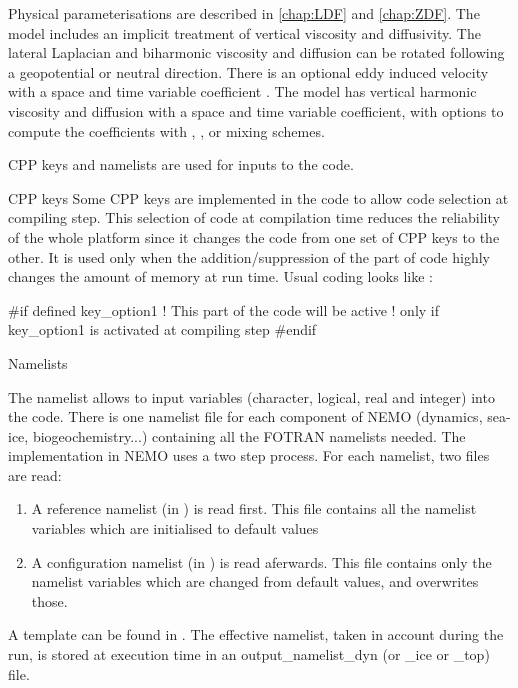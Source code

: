 \documentclass[../main/NEMO_manual]{subfiles}
\begin{document}
Physical parameterisations are described in \autoref{chap:LDF} and \autoref{chap:ZDF}.
The model includes an implicit treatment of vertical viscosity and diffusivity.
The lateral Laplacian and biharmonic viscosity and diffusion can be rotated following
a geopotential or neutral direction.
There is an optional eddy induced velocity \citep{Gent1990} with a space and time variable coefficient
\citet{Treguier1997}.
The model has vertical harmonic viscosity and diffusion with a space and time variable coefficient,
with options to compute the coefficients with \citet{Blanke1993}, \citet{Pacanowski_Philander_JPO81},
or \citet{Umlauf_Burchard_JMS03} mixing schemes.
 \vspace{1cm}
 

\noindent CPP keys and namelists are used for inputs to the code.  \newline

\noindent {} CPP keys \newline
Some CPP keys are implemented in the \fortran code to allow code selection at compiling step.
This selection of code at compilation time reduces the reliability of the whole platform since
it changes the code from one set of CPP keys to the other.
It is used only when the addition/suppression of the part of code highly changes the amount of memory at run time.
Usual coding looks like : 
\begin{forlines}
#if defined key_option1
	! This part of the \fortran code will be active
	! only if key_option1 is activated at compiling step
#endif
\end{forlines}

\noindent {} Namelists

The namelist allows to input variables (character, logical, real and integer) into the code.
There is one namelist file for each component of NEMO (dynamics, sea-ice, biogeochemistry...)
containing all the FOTRAN namelists needed.
The implementation in NEMO uses a two step process. For each \fortran namelist, two files are read:
\begin{enumerate}
\item
  A reference namelist (in ) is read first.
  This file contains all the namelist variables which are initialised to default values
\item
  A configuration namelist (in ) is read aferwards.
  This file contains only the namelist variables which are changed from default values, and overwrites those.
\end{enumerate}
A template can be found in .
The effective namelist, taken in account during the run, is stored at execution time in
an output\_namelist\_dyn (or \_ice or \_top) file.
\vspace{1cm}
\end{document}
